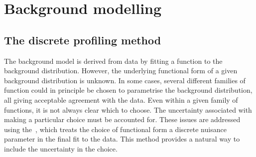 

\section{Background modelling}
\label{model:sec:background_model}
\subsection{The discrete profiling method}
\label{model:sec:background_model_envelope}

The background model is derived from data by fitting a function to the background distribution. However, the underlying functional form of a given background distribution is unknown. In some cases, several different families of function could in principle be chosen to parametrise the background distribution, all giving acceptable agreement with the data. Even within a given family of functions, it is not always clear which to choose. The uncertainty associated with making a particular choice must be accounted for. %
These issues are addressed using the~\cite{DiscreteProfiling}, which treats the choice of functional form a discrete nuisance parameter in the final \NLL fit to the data. This method provides a natural way to include the uncertainty in the choice.


